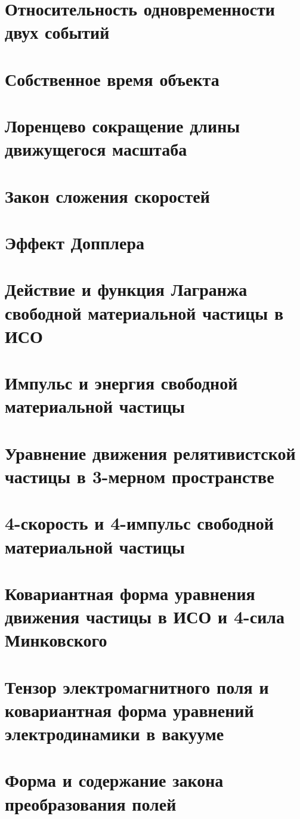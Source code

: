 \documentclass[10pt,landscape,a4paper]{article}
\begin{document}
\begin{multicols*}{5}
		\section{Относительность одновременности двух событий}
		\section{Собственное время объекта}
		\section{Лоренцево сокращение длины движущегося масштаба}
		\section{Закон сложения скоростей}
		\section{Эффект Допплера}
		\section{Действие и функция Лагранжа свободной материальной частицы в ИСО}
		\section{Импульс и энергия свободной материальной частицы}
		\section{Уравнение движения релятивистской частицы в 3-мерном пространстве}
		\section{4-скорость и 4-импульс свободной материальной частицы}
		\section{Ковариантная форма уравнения движения частицы в ИСО и 4-сила Минковского}
		\section{Тензор электромагнитного поля и ковариантная форма уравнений электродинамики в вакууме}
		\section{Форма и содержание закона преобразования полей}

\end{multicols*}
\end{document}

